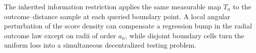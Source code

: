 The inherited information restriction applies the same measurable map \(T_n\) to the outcome--distance sample at each queried boundary point.  A local angular perturbation of the score density can compensate a regression bump in the radial outcome law except on radii of order \(a_n\), while disjoint boundary cells turn the uniform loss into a simultaneous decentralized testing problem.